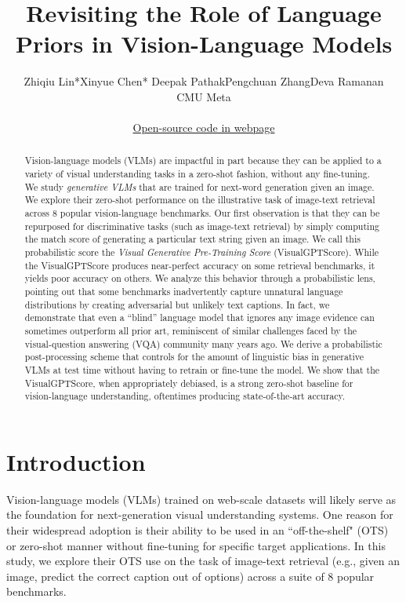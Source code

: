 \documentclass{article} \usepackage{iclr2024_conference,times}
\title{Revisiting the Role of Language Priors in Vision-Language Models}
\author{Zhiqiu Lin*\quad Xinyue Chen* \quad Deepak Pathak\quad Pengchuan Zhang\quad Deva Ramanan \\
  CMU \quad\quad Meta \\ \\
  \href{https://linzhiqiu.github.io/papers/visual_gpt_score}{Open-source code in webpage}
}
\begin{document}
\maketitle

\begin{abstract}
Vision-language models (VLMs) are impactful in part because they can be applied to a variety of visual understanding tasks in a zero-shot fashion, without any fine-tuning. We study \textit{generative VLMs} that are trained for next-word generation given an image. We explore their zero-shot performance on the illustrative task of image-text retrieval across 8 popular vision-language benchmarks. Our first observation is that they can be repurposed for discriminative tasks (such as image-text retrieval) by simply computing the match score of generating a particular text string given an image. We call this probabilistic score the {\em Visual Generative Pre-Training Score} (VisualGPTScore). While the VisualGPTScore produces near-perfect accuracy on some retrieval benchmarks, it yields poor accuracy on others. We analyze this behavior through a probabilistic lens, pointing out that some benchmarks inadvertently capture unnatural language distributions by creating adversarial but unlikely text captions. In fact, we demonstrate that even a ``blind'' language model that ignores any image evidence can sometimes outperform all prior art, reminiscent of similar challenges faced by the visual-question answering (VQA) community many years ago. We derive a probabilistic post-processing scheme that controls for the amount of linguistic bias in generative VLMs at test time without having to retrain or fine-tune the model. We show that the VisualGPTScore, when appropriately debiased, is a strong zero-shot baseline for vision-language understanding, oftentimes producing state-of-the-art accuracy.


\end{abstract}


\section{Introduction}
Vision-language models (VLMs) trained on web-scale datasets will likely serve as the foundation for next-generation visual understanding systems. One reason for their widespread adoption is their ability to be used in an ``off-the-shelf" (OTS) or zero-shot manner without fine-tuning for specific target applications. In this study, we explore their OTS use on the task of image-text retrieval (e.g., given an image, predict the correct caption out of  options) across a suite of 8 popular benchmarks. 
\end{document}
